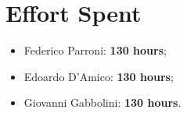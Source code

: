 \chapter{Effort Spent}
\begin{itemize}
\item Federico Parroni: \textbf{130 hours};
\item Edoardo D'Amico: \textbf{130 hours};
\item Giovanni Gabbolini: \textbf{130 hours}.
\end{itemize}